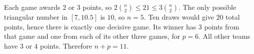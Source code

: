 Each game awards $2$ or $3$ points, so
$2\binom n2\le21\le3\binom n2$. The only possible triangular number in $[7,10.5]$ is $10$, so $n=5$. Ten draws would give $20$ total points, hence there is exactly one decisive game. Its winner has $3$ points from that game and one from each of its other three games, for $p=6$. All other teams have $3$ or $4$ points. Therefore $\boxed{n+p=11}$.
